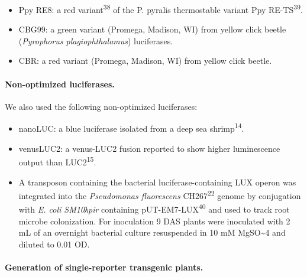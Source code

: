 \documentclass[]{article}
\begin{document}
\begin{itemize}
\item
  Ppy RE8: a red variant\textsuperscript{38} of the P. pyralis
  thermostable variant Ppy RE-TS\textsuperscript{39}.
\item
  CBG99: a green variant (Promega, Madison, WI) from yellow click beetle
  (\emph{Pyrophorus plagiophthalamus}) luciferases.
\item
  CBR: a red variant (Promega, Madison, WI) from yellow click beetle.
\end{itemize}

\paragraph{Non-optimized luciferases.}\label{non-optimized-luciferases.}

We also used the following non-optimized luciferases:

\begin{itemize}
\item
  nanoLUC: a blue luciferase isolated from a deep sea
  shrimp\textsuperscript{14}.
\item
  venusLUC2: a venus-LUC2 fusion reported to show higher luminescence
  output than LUC2\textsuperscript{15}.
\item
  A transposon containing the bacterial luciferase-containing LUX operon
  was integrated into the \emph{Pseudomonas fluorescens}
  CH267\textsuperscript{22} genome by conjugation with \emph{E. coli
  SM10λpir} containing pUT-EM7-LUX\textsuperscript{40} and used to track
  root microbe colonization. For inoculation 9 DAS plants were
  inoculated with 2 mL of an overnight bacterial culture resuspended in
  10 mM MgSO\textasciitilde{}4 and diluted to 0.01 OD.
\end{itemize}

\paragraph{Generation of single-reporter transgenic
plants.}\label{generation-of-single-reporter-transgenic-plants.}
\end{document}
